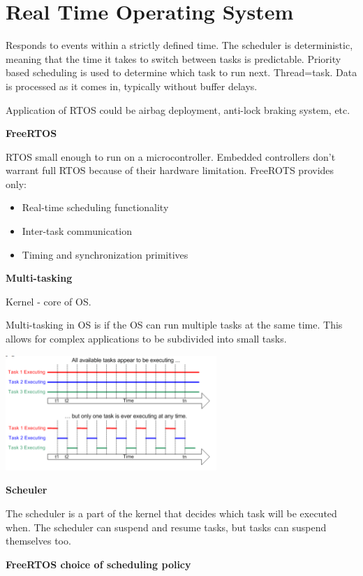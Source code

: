 \section{Real Time Operating System}

Responds to events within a strictly defined time.
The scheduler is deterministic, meaning that the time it takes to switch between tasks is predictable.
Priority based scheduling is used to determine which task to run next. Thread=task.
Data is processed as it comes in, typically without buffer delays.

Application of RTOS could be airbag deployment, anti-lock braking system, etc.

\textbf{FreeRTOS}

RTOS small enough to run on a microcontroller. Embedded controllers don't warrant full RTOS
because of their hardware limitation. FreeROTS provides only:

\begin{itemize}
	\item Real-time scheduling functionality
	\item Inter-task communication
	\item Timing and synchronization primitives
\end{itemize}

\textbf{Multi-tasking}

Kernel - core of OS.

Multi-tasking in OS is if the OS can run multiple tasks at the same time.
This allows for complex applications to be subdivided into small tasks.

\begin{center}
	\includegraphics[width=0.6\textwidth]{images/multitasking.png}
\end{center}

\textbf{Scheuler}

The scheduler is a part of the kernel that decides which task will be executed when.
The scheduler can suspend and resume tasks, but tasks can suspend themselves too.

\textbf{FreeRTOS choice of scheduling policy}

